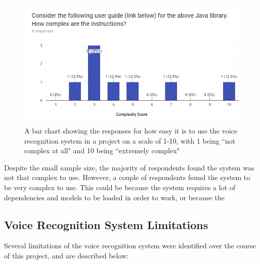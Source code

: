 \documentclass[11pt]{article}
\begin{document}
\begin{center}
\begin{figure}[H]
\begin{center}
  \includegraphics[width=\linewidth]{survey-ease}
  \caption{A bar chart showing the responses for how easy it is to use the voice recognition system in a project on a scale of 1-10, with 1 being ``not complex at all" and 10 being ``extremely complex"}
  \label{fig:survey-ease}
  \end{center}
\end{figure}
\end{center}

Despite the small sample size, the majority of respondents found the system was not that complex to use. However, a couple of respondents found the system to be very complex to use. This could be because the system requires a lot of dependencies and models to be loaded in order to work, or because the

\subsection{Voice Recognition System Limitations}

Several limitations of the voice recognition system were identified over the course of this project, and are described below:
\end{document}
